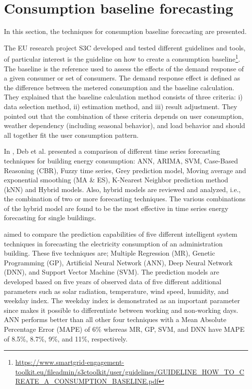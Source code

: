 \section{Consumption baseline forecasting}
\label{sec:baselinesoa}
\vspace{0.2 cm}

In this section, the techniques for consumption baseline forecasting are presented.

The EU research project S3C developed and tested different guidelines and tools, of particular interest is the guideline on how to create a consumption baseline\footnote{ \url{https://www.smartgrid-engagement-toolkit.eu/fileadmin/s3ctoolkit/user/guidelines/GUIDELINE_HOW_TO_CREATE_A_CONSUMPTION_BASELINE.pdf} }.
The baseline is the reference used to assess the effects of the demand response of a given consumer or set of consumers.
The demand response effect is defined as the difference between the metered consumption and the baseline calculation.
They explained that the baseline calculation method consists of three criteria:
i) data selection method,
ii) estimation method,
and iii) result adjustment.
They pointed out that the combination of these criteria depends on user consumption, weather dependency (including seasonal behavior), and load behavior and should all together fit the user consumption pattern.

In \cite{DEB2017902}, Deb et al. presented a comparison of different time series forecasting techniques for building energy consumption: ANN, ARIMA, SVM, Case-Based Reasoning (CBR), Fuzzy time series, Grey prediction model, Moving average and exponential smoothing (MA \& ES), K-Nearest Neighbor prediction method (kNN) and Hybrid models.
Also, hybrid models are reviewed and analyzed, i.e., the combination of two or more forecasting techniques.
The various combinations of the hybrid model are found to be the most effective in time series energy forecasting for single buildings.

\cite{AMBER2018886} aimed to compare the prediction capabilities of five different intelligent system techniques in forecasting the electricity consumption of an administration building.
These five techniques are; Multiple Regression (MR), Genetic Programming (GP), Artificial Neural Network (ANN), Deep Neural Network (DNN), and Support Vector Machine (SVM).
The prediction models are developed based on five years of observed data of five different additional parameters such as solar radiation, temperature, wind speed, humidity, and weekday index.
The weekday index is demonstrated as an important parameter since makes it possible to differentiate between working and non-working days.
ANN performs better than all other four techniques with a Mean Absolute Percentage Error (MAPE) of 6\% whereas MR, GP, SVM, and DNN have MAPE of 8.5\%, 8.7\%, 9\%, and 11\%, respectively.

